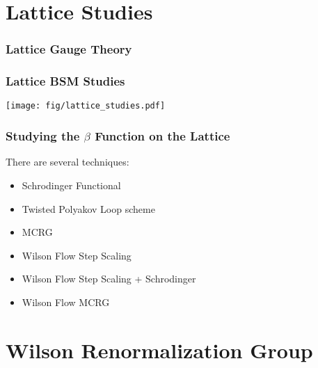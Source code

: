 \documentclass{beamer}
\begin{document}

  \section{Lattice Studies}
  \addtocounter{framenumber}{-1}

  \begin{frame}
    \frametitle{Lattice Gauge Theory}
    \centering
  \end{frame}

  \begin{frame}
    \frametitle{Lattice BSM Studies}
    \centering
    \texttt{[image: fig/lattice\_studies.pdf]}
  \end{frame}

  \begin{frame}
    \frametitle{Studying the $\beta$ Function on the Lattice}
    \begin{center}
      There are several techniques:
    \end{center}
    \begin{itemize}
      \item Schrodinger Functional
      \item Twisted Polyakov Loop scheme
      \item MCRG
      \item Wilson Flow Step Scaling
      \item Wilson Flow Step Scaling + Schrodinger
      \item Wilson Flow MCRG
    \end{itemize}
  \end{frame}


  \section{Wilson Renormalization Group}
  \addtocounter{framenumber}{-1}
\end{document}
